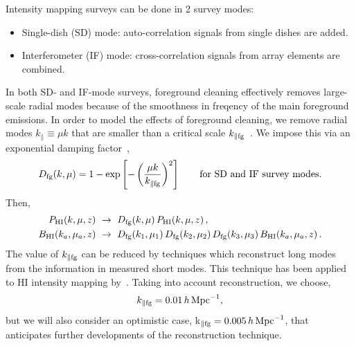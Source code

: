 Intensity mapping surveys can be done in 2 survey modes:
\begin{itemize}
\item Single-dish (SD) mode: auto-correlation signals from single dishes are added.
\item Interferometer (IF) mode: cross-correlation signals from array elements are combined. 
\end{itemize}  
In both SD- and IF-mode surveys, foreground cleaning effectively removes large-scale radial modes because of the smoothness in freqency of the main foreground emissions. In order to model the effects of foreground cleaning, we remove radial modes $k_\| \equiv \mu k$ that are smaller than a critical scale $k_{\| \mathrm{fg}}$~\cite{Karagiannis:2018jdt}.
We impose this via an exponential damping factor~\cite{Bull:2014rha},
\begin{equation}\label{eq:expdampfact}
D_{\mathrm{fg}}(k,\mu) = 1 - \exp\left[-\left(\frac{\mu k}{k_{\| \mathrm{fg}}}\right)^2\right]\qquad \mbox{for SD and IF survey modes.}
\end{equation}
Then, 
\begin{align}
P_{{\mathrm{HI}}}(k,\mu,z)  &~\to~ D_{\mathrm{fg}} (k,\mu)\,P_{{\mathrm{HI}}}(k,\mu,z) \,,\\
B_{{\mathrm{HI}}}(k_a,\mu_a,z) & ~\to~ D_{\mathrm{fg}} (k_1,\mu_1)\,D_{\mathrm{fg}} (k_2,\mu_2)\,D_{\mathrm{fg}} (k_3,\mu_3)\,B_{{\mathrm{HI}}}(k_a,\mu_a,z)\,.
\end{align}
The value of $k_{\| \mathrm{fg}}$ can be reduced by techniques which reconstruct long modes from the information in measured short modes. This technique has been applied to HI intensity mapping by~\cite{Zhu:2016esh,Modi:2019hnu}. Taking into account reconstruction, we choose,
\begin{equation} \label{kfgpar}
k_{\| \mathrm{fg}} = 0.01 \,h\,\mathrm{Mpc}^{-1},
\end{equation}
but we will also consider an optimistic case, k$_{\| \mathrm{fg}} = 0.005 \,h\,\mathrm{Mpc}^{-1}$, that anticipates further developments of the reconstruction technique.

